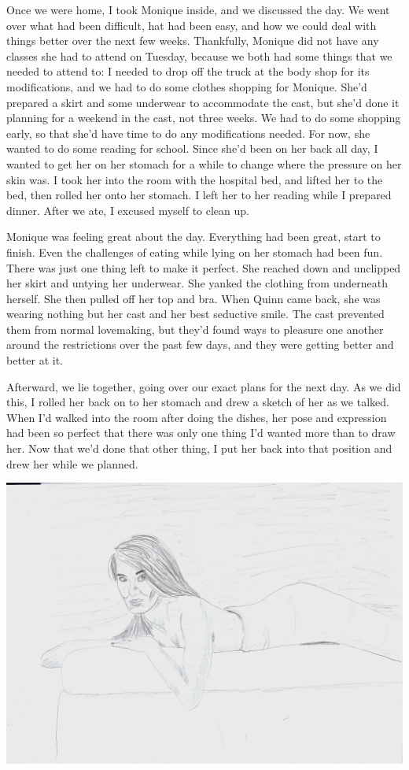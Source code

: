 Once we were home, I took Monique inside, and we discussed the day. We went over what had
been difficult, hat had been easy, and how we could deal with things better over the next few
weeks. Thankfully, Monique did not have any classes she had to attend on Tuesday, because we
both had some things that we needed to attend to: I needed to drop off the truck at the body
shop for its modifications, and we had to do some clothes shopping for Monique. She'd prepared a
skirt and some underwear to accommodate the cast, but she'd done it planning for a weekend in
the cast, not three weeks. We had to do some shopping early, so that she'd have time to do any
modifications needed. For now, she wanted to do some reading for school. Since she'd been on her
back all day, I wanted to get her on her stomach for a while to change where the pressure on her
skin was. I took her into the room with the hospital bed, and lifted her to the bed, then rolled
her onto her stomach. I left her to her reading while I prepared dinner. After we ate, I excused
myself to clean up.

\begin{thought}
Monique was feeling great about the day. Everything had been great, start to finish. Even
the challenges of eating while lying on her stomach had been fun. There was just one thing left
to make it perfect. She reached down and unclipped her skirt and untying her underwear. She
yanked the clothing from underneath herself. She then pulled off her top and bra. When Quinn
came back, she was wearing nothing but her cast and her best seductive smile. The cast prevented
them from normal lovemaking, but they'd found ways to pleasure one another around the
restrictions over the past few days, and they were getting better and better at it.
\end{thought}

Afterward, we lie together, going over our exact plans for the next day. As we did this, I
rolled her back on to her stomach and drew a sketch of her as we talked. When I'd walked into
the room after doing the dishes, her pose and expression had been so perfect that there was only
one thing I'd wanted more than to draw her. Now that we'd done that other thing, I put her back
into that position and drew her while we planned.

\newpage
\begin{center}
\includegraphics[width=\textwidth]{images/kicks45.jpg}
\end{center}
